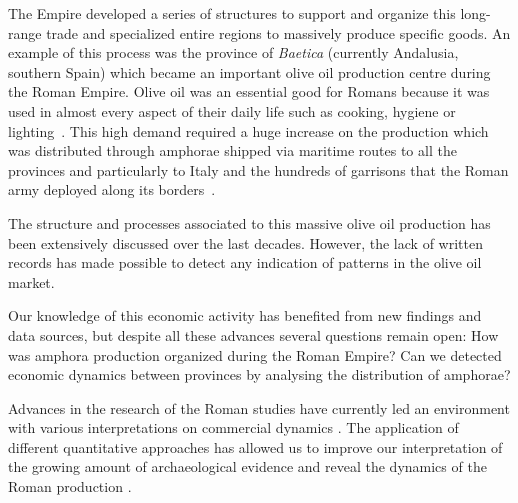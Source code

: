 \documentclass[review]{elsarticle}
\newcommand{\memo}[2]{\textcolor{#1}{#2}}
\newcommand{\xavi}[1]{\memo{magenta}{XRC: #1\\}}
\begin{document}
The Empire developed a series of structures to support and organize this long-range trade and specialized entire regions to massively produce specific goods. An example of this process was the province of \textit{Baetica} (currently Andalusia, southern Spain) which became an important olive oil production centre during the Roman Empire. Olive oil was an essential good for Romans because it was used in almost every aspect of their daily life such as cooking, hygiene or lighting~\citep{mattingly_d.j._oil_1988}. This high demand required a huge increase on the production which was distributed through amphorae shipped via maritime routes to all the provinces and particularly to Italy and the hundreds of garrisons that the Roman army deployed along its borders~\citep{blazquez_exportacion_1980}. 

The structure and processes associated to this massive olive oil production has been extensively discussed over the last decades\citep{rodriguez_economioleicola_1977, Chic_hispania_1997,millet_anforas_1998}. 
However, the lack of written records has made possible to detect any indication of patterns in the olive oil market.

Our knowledge of this economic activity has benefited from new findings and data sources, but despite all these advances several questions remain open: How was amphora production organized during the Roman Empire? Can we detected economic dynamics between provinces by analysing the distribution of amphorae?





Advances in the research of the Roman studies have currently led an environment with various interpretations on commercial dynamics \citep{duncan1982economy,
temin_economy_2006,
quantifyingwilson2009}.
The application of different quantitative approaches has allowed us to improve our interpretation of the growing amount of archaeological evidence and reveal the dynamics of the Roman production %
\citep{brughmans_roman_2016,
orengo_seeds_2016,bayesian_2018,
coto-sarmiento_identifying_2018,
rubio-campillo_ecology_2018}.
\end{document}
